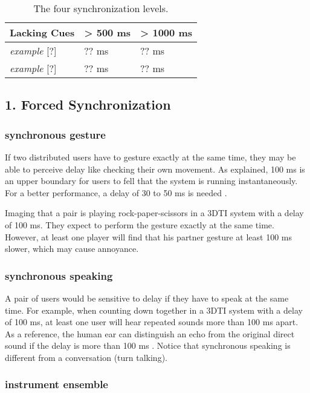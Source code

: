 \begin{table} [!htbp]
\begin{tabular}{|p{}|p{}|p{}|}
\hline
\textbf{Lacking Cues} & \textbf{> 500 ms} & \textbf{> 1000 ms} \\
\hline
\emph{example} [?] & ?? ms & ?? ms \\
\hline
\emph{example} [?] & ?? ms & ?? ms \\
\hline

\end{tabular}
\caption{The four synchronization levels.}
\label{tab:table_synchronization_levels}
\end{table}

\subsection{1. Forced Synchronization}


\subsubsection{synchronous gesture}

If two distributed users have to gesture exactly at the same time, they may be able to perceive delay like checking their own movement. As \cite{nielsen1993response} explained, 100 ms is an upper boundary for users to fell that the system is running instantaneously. For a better performance, a delay of 30 to 50 ms is needed \cite{chen2007review}.

Imaging that a pair is playing rock-paper-scissors in a 3DTI system with a delay of 100 ms. They expect to perform the gesture exactly at the same time. However, at least one player will find that his partner gesture at least 100 ms slower, which may cause annoyance.

\subsubsection{synchronous speaking}

A pair of users would be sensitive to delay if they have to speak at the same time. For example, when counting down together in a 3DTI system with a delay of 100 ms, at least one user will hear repeated sounds more than 100 ms apart. As a reference, the human ear can distinguish an echo from the original direct sound if the delay is more than 100 ms \cite{wolfel2009distant}. Notice that synchronous speaking is different from a conversation (turn talking).

\subsubsection{instrument ensemble}

